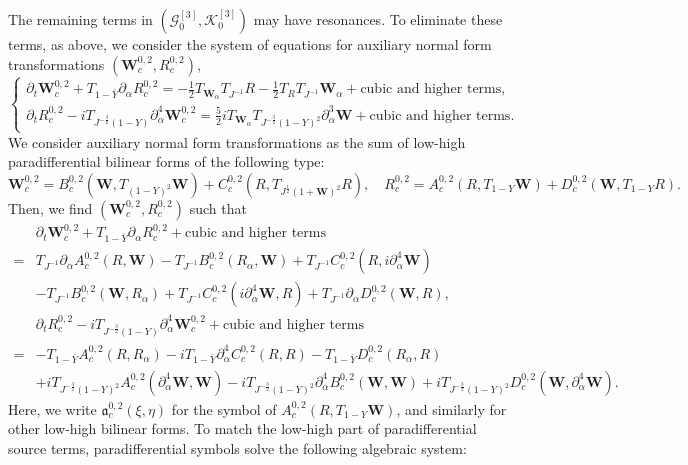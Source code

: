 \documentclass[10pt]{amsart}
\theoremstyle{remark}
\theoremstyle{definition}
\numberwithin{equation}{section}
\newcommand{\p}{\partial}
\newcommand{\al}{\alpha}
\newcommand{\f}{\frac}
\newcommand{\bw}{\mathbf{W}}
\begin{document}
The remaining terms in $(\mathcal{G}_0^{[3]}, \mathcal{K}_0^{[3]})$ may have resonances. 
To eliminate these terms, as above, we consider the system  of equations for auxiliary normal form transformations $(\bw^{0,2}_c, R^{0,2}_c)$,
\begin{equation*}  
\begin{cases}
\p_t \bw^{0,2}_c+T_{1-\bar{Y}}\p_\al R^{0,2}_c= -\f12 T_{\bw_\al}T_{J^{-1}}R -\f12  T_R T_{J^{-1}}\bw_\al  + \text{cubic and higher terms},\\
\p_t R^{0,2}_c-iT_{J^{-\f32}(1-Y)}\p_\al^4\bw^{0,2}_c= \f52i  T_{\bw_\al} T_{J^{-\f32}(1-Y)^2} \p_\al^3 \bw  + \text{cubic and higher terms}.
\end{cases}
\end{equation*}
We consider auxiliary normal form transformations as the sum of low-high paradifferential bilinear forms of the following type:
\begin{equation*} 
\bw^{0,2}_{c} = B^{0,2}_{c}\left(\bw, T_{(1-Y)^2}\bw \right) + C^{0,2}_{c}\left(R, T_{J^\f12(1+\bw)^2}R \right),\quad R^{0,2}_{c} = A^{0,2}_{c} \left(R, T_{1-Y}\bw \right) + D^{0,2}_{c}\left(\bw, T_{1-Y}R\right).
\end{equation*}
Then, we find $(\bw^{0,2}_{c}, R^{0,2}_{c})$ such that
\begin{align*}
 &\p_t \bw^{0,2}_c+T_{1-\bar{Y}}\p_\al R^{0,2}_c  + \text{cubic and higher terms} \\
=& T_{J^{-1}}\partial_\alpha A^{0,2}_c(R, \bw) -T_{J^{-1}}B^{0,2}_{c}(R_\alpha, \bw) +  T_{J^{-1}}C^{0,2}_{c}(R, i\p_\al^4\bw) \\
&-T_{J^{-1}}B^{0,2}_{c}(\bw, R_\alpha)+ T_{J^{-1}}C^{0,2}_{c}(i\p_\al^4\bw, R) + T_{J^{-1}}\partial_\alpha D^{0,2}_{c}(\bw, R),\\
&\p_t R^{0,2}_c-iT_{J^{-\f32}(1-Y)}\p_\al^4\bw^{0,2}_c+ \text{cubic and higher  terms} \\
=& -T_{1-\bar{Y}}A^{0,2}_{c}(R, R_\alpha) - iT_{1-\bar{Y}}\partial_\alpha^4 C^{0,2}_{c}(R, R) - T_{1-\bar{Y}}D^{0,2}_{c}(R_\alpha, R)\\
&+ iT_{J^{-\f32}(1-Y)^2}A^{0,2}_{c}(\p_\al^4\bw, \bw) -iT_{J^{-\f32}(1-Y)^2}\partial_\alpha^4 B^{0,2}_{c}(\bw, \bw) +iT_{J^{-\f32}(1-Y)^2}D^{0,2}_{c}(\bw, \p_\al^4\bw).
\end{align*}
Here, we write $\mathfrak{a}^{0,2}_{c}(\xi, \eta)$ for the symbol of $A^{0,2}_{c}(R, T_{1-Y}\bw)$, and similarly for other low-high bilinear forms.
To match the low-high part of paradifferential source terms, paradifferential symbols solve the following algebraic system: 
\end{document}
